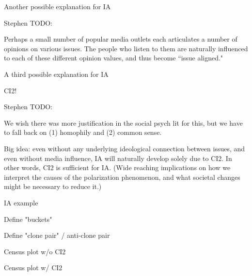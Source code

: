\documentclass[12pt]{beamer}
\begin{document}
\begin{frame}[c]{Another possible explanation for IA} %

{\tiny \color{red} 
Stephen TODO:

Perhaps a small number of popular media outlets each articulates a number of
opinions on various issues. The people who listen to them are naturally
influenced to each of these different opinion values, and thus become ``issue
aligned."
}

\end{frame}

\begin{frame}[c]{A third possible explanation for IA} %

CI2!

{\tiny \color{red} 
Stephen TODO:

We wish there was more justification in the social psych lit for this, but we
have to fall back on (1) homophily and (2) common sense.
}

{\small \color{red} 
Big idea: even without any underlying ideological connection between issues,
and even without media influence, IA will naturally develop solely due to CI2.
In other words, CI2 is sufficient for IA. (Wide reaching implications on how we
interpret the causes of the polarization phenomenon, and what societal changes
might be necessary to reduce it.)
}

\end{frame}

\begin{frame}[c]{IA example} %

\end{frame}


\begin{frame}[c]{Define "buckets"} %

\end{frame}


\begin{frame}[c]{Define "clone pair" / anti-clone pair} %

\end{frame}



\begin{frame}[c]{Census plot w/o CI2} %

\end{frame}

\begin{frame}[c]{Census plot w/ CI2} %

\end{frame}
\end{document}
